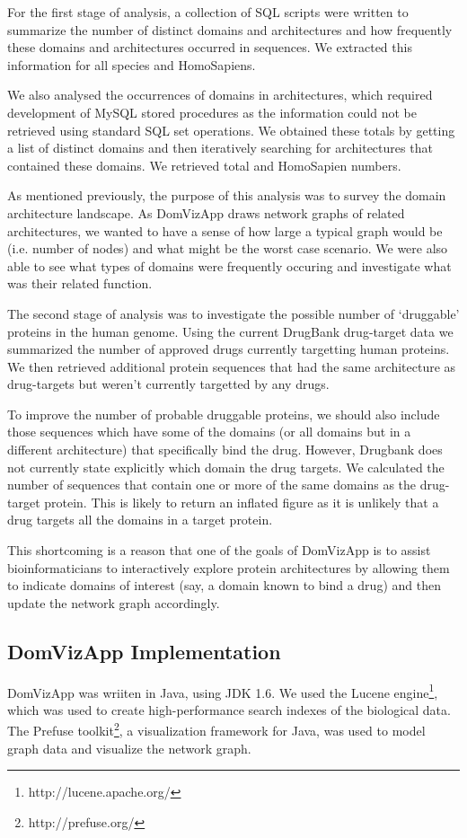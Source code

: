For the first stage of analysis, a collection of SQL scripts were written to summarize the number of distinct domains and architectures and how frequently these domains and architectures occurred in sequences. We extracted this information for all species and HomoSapiens.

We also analysed the occurrences of domains in architectures, which required development of MySQL stored procedures as the information could not be retrieved using standard SQL set operations. We obtained these totals by getting a list of distinct domains and then iteratively searching for architectures that contained these domains. We retrieved total and HomoSapien numbers.

As mentioned previously, the purpose of this analysis was to survey the domain architecture landscape. As DomVizApp draws network graphs of related architectures, we wanted to have a sense of how large a typical graph would be (i.e. number of nodes) and what might be the worst case scenario. We were also able to see what types of domains were frequently occuring and investigate what was their related function.

The second stage of analysis was to investigate the possible number of `druggable' proteins in the human genome. Using the current DrugBank drug-target data we summarized the number of approved drugs currently targetting human proteins. We then retrieved additional protein sequences that had the same architecture as drug-targets but weren't currently targetted by any drugs.

To improve the number of probable druggable proteins, we should also include those sequences which have some of the domains (or all domains but in a different architecture) that specifically bind the drug. However, Drugbank does not currently state explicitly which domain the drug targets. We calculated the number of sequences that contain one or more of the same domains as the drug-target protein. This is likely to return an inflated figure as it is unlikely that a drug targets all the domains in a target protein.

This shortcoming is a reason that one of the goals of DomVizApp is to assist bioinformaticians to interactively explore protein architectures by allowing them to indicate domains of interest (say, a domain known to bind a drug) and then update the network graph accordingly.

\subsection{DomVizApp Implementation}
DomVizApp was wriiten in Java, using JDK 1.6. We used the Lucene engine\footnote{http://lucene.apache.org/}, which was used to create high-performance search indexes of the biological data. The Prefuse toolkit\footnote{http://prefuse.org/}, a visualization framework for Java, was used to model graph data and visualize the network graph.

